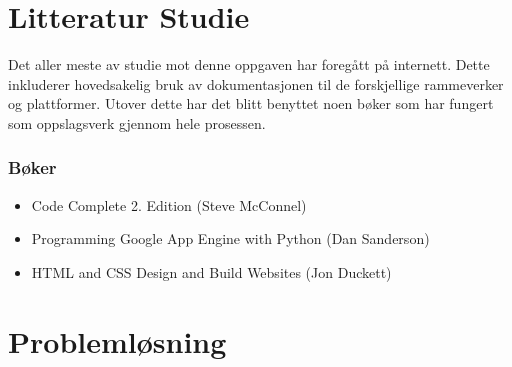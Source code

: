 \section{Litteratur Studie}
Det aller meste av studie mot denne oppgaven har foregått på internett. Dette inkluderer hovedsakelig bruk av dokumentasjonen til de forskjellige rammeverker og plattformer. Utover dette har det blitt benyttet noen bøker som har fungert som oppslagsverk gjennom hele prosessen.

\subsubsection*{Bøker}
\begin{itemize}
\item Code Complete 2. Edition (Steve McConnel)
\item Programming Google App Engine with Python (Dan Sanderson)
\item HTML and CSS Design and Build Websites (Jon Duckett)
\end{itemize}


\section{Problemløsning}
